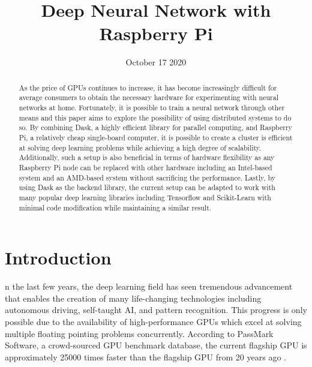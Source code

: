 \documentclass[conference]{IEEEtran}
\begin{document}
    \title{Deep Neural Network with Raspberry Pi}


    \author{
        \and
    }
    \date{October 17 2020}
    \maketitle

    \begin{abstract}
        As the price of GPUs continues to increase, it has become increasingly difficult for average consumers to obtain the necessary hardware for experimenting with neural networks at home. Fortunately, it is possible to train a neural network through other means and this paper aims to explore the possibility of using distributed systems to do so. By combining Dask, a highly efficient library for parallel computing, and Raspberry Pi, a relatively cheap single-board computer, it is possible to create a cluster is efficient at solving deep learning problems while achieving a high degree of scalability. Additionally, such a setup is also beneficial in terms of hardware flexibility as any Raspberry Pi node can be replaced with other hardware including an Intel-based system and an AMD-based system without sacrificing the performance. Lastly, by using Dask as the backend library, the current setup can be adapted to work with many popular deep learning libraries including Tensorflow and Scikit-Learn with minimal code modification while maintaining a similar result.
        \end{abstract}

    \section{Introduction}
        n the last few years, the deep learning field has seen tremendous advancement that enables the creation of many life-changing technologies including autonomous driving, self-taught AI, and pattern recognition. This progress is only possible due to the availability of high-performance GPUs which excel at solving multiple floating pointing problems concurrently.
        According to PassMark Software, a crowd-sourced GPU benchmark database, the current flagship GPU is approximately 25000 times faster than the flagship GPU from 20 years ago \cite{passmark_software}. 
\end{document}
